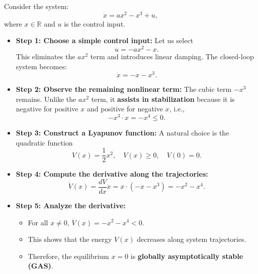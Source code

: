 \begin{example}
Consider the system:
\begin{equation}
\dot{x} = a x^2 - x^3 + u,
\end{equation}
where \(x \in \mathbb{R}\) and \(u\) is the control input.  

\begin{itemize}
    \item \textbf{Step 1: Choose a simple control input:}  
    Let us select
    \begin{equation}
    u = - a x^2 - x.
    \end{equation}
    This eliminates the \(a x^2\) term and introduces linear damping. The closed-loop system becomes:
    \begin{equation}
    \dot{x} = - x - x^3.
    \end{equation}

    \item \textbf{Step 2: Observe the remaining nonlinear term:}  
    The cubic term \(-x^3\) remains. Unlike the \(a x^2\) term, it \textbf{assists in stabilization} because it is negative for positive \(x\) and positive for negative \(x\), i.e.,
    \begin{equation}
    -x^3 \cdot x = -x^4 \le 0.
    \end{equation}

    \item \textbf{Step 3: Construct a Lyapunov function:}  
    A natural choice is the quadratic function
    \begin{equation}
    V(x) = \frac{1}{2} x^2, \quad V(x) \ge 0, \quad V(0)=0.
    \end{equation}

    \item \textbf{Step 4: Compute the derivative along the trajectories:}  
    \begin{equation}
    \dot{V}(x) = \frac{dV}{dx} \dot{x} = x \cdot (-x - x^3) = -x^2 - x^4.
    \end{equation}

    \item \textbf{Step 5: Analyze the derivative:}  
    \begin{itemize}
        \item For all \(x \neq 0\), \(\dot{V}(x) = -x^2 - x^4 < 0\).  
        \item This shows that the energy \(V(x)\) decreases along system trajectories.  
        \item Therefore, the equilibrium \(x=0\) is \textbf{globally asymptotically stable (GAS)}.
    \end{itemize}


\end{itemize}
\end{example}
